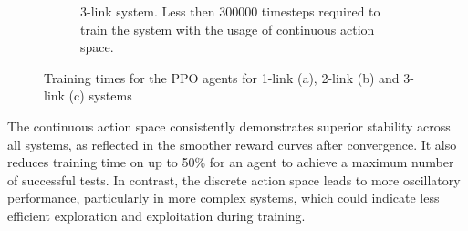 \begin{figure}[h!]
\begin{subfigure}[t]{0.48\textwidth}
		\label{fig: tp - training time}
		\caption{3-link system. Less then 300000 timesteps required to train the system with the usage of continuous action space.}
	\end{subfigure}
	
	\caption{Training times for the PPO agents for 1-link (a), 2-link (b) and 3-link (c) systems}
	\label{fig: training time comparison}
\end{figure}

The continuous action space consistently demonstrates superior stability across all systems, as reflected in the smoother reward curves after convergence. It also reduces training time on up to 50\% for an agent to achieve a maximum number of successful tests. In contrast, the discrete action space leads to more oscillatory performance, particularly in more complex systems, which could indicate less efficient exploration and exploitation during training.

